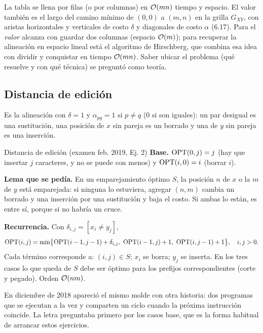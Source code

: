 La tabla se llena por filas (o por columnas) en $\mathcal{O}(mn)$ tiempo y espacio.
El valor también es el largo del camino mínimo de $(0,0)$ a $(m,n)$ en la
grilla $G_{XY}$, con aristas horizontales y verticales de costo $\delta$ y
diagonales de costo $\alpha$ (6.17). Para el \emph{valor} alcanza con
guardar dos columnas (espacio $\mathcal{O}(m)$); para recuperar la alineación en
espacio lineal está el algoritmo de Hirschberg, que combina esa idea con
dividir y conquistar en tiempo $\mathcal{O}(mn)$. Saber ubicar el problema (qué
resuelve y con qué técnica) se preguntó como teoría.

\subsection{Distancia de edición}

Es la alineación con $\delta=1$ y $\alpha_{pq}=1$ si $p\ne q$ (0 si son
iguales): un par desigual es una sustitución, una posición de $x$ sin pareja
es un borrado y una de $y$ sin pareja es una inserción.

\begin{problema}{Distancia de edición (examen feb. 2019, Ej. 2)}
\textbf{Base.} $\mathrm{OPT}(0,j)=j$ (hay que insertar $j$ caracteres, y no se puede
con menos) y $\mathrm{OPT}(i,0)=i$ (borrar $i$).

\textbf{Lema que se pedía.} En un emparejamiento óptimo $S$, la posición $n$
de $x$ o la $m$ de $y$ está emparejada: si ninguna lo estuviera, agregar
$(n,m)$ cambia un borrado y una inserción por una sustitución y baja el
costo. Si ambas lo están, es entre sí, porque si no habría un cruce.

\textbf{Recurrencia.} Con $\delta_{i,j}=[x_i\ne y_j]$,
\[
\OPT(i,j)=\min\bigl\{\OPT(i-1,j-1)+\delta_{i,j},\ \OPT(i-1,j)+1,\ \OPT(i,j-1)+1\bigr\},\quad i,j>0.
\]
Cada término corresponde a: $(i,j)\in S$; $x_i$ se borra; $y_j$ se inserta.
En los tres casos lo que queda de $S$ debe ser óptimo para los prefijos
correspondientes (corte y pegado). Orden $\mathcal{O}(nm)$.
\end{problema}

En diciembre de 2018 apareció el mismo molde con otra historia: dos programas
que se ejecutan a la vez y comparten un ciclo cuando la próxima instrucción
coincide. La letra preguntaba primero por los casos base, que es la forma
habitual de arrancar estos ejercicios.

